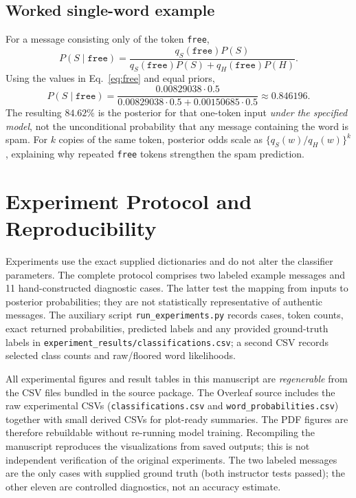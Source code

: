 \documentclass[11pt,letterpaper]{article}
\begin{document}
\subsection{Worked single-word example}
For a message consisting only of the token \texttt{free},
\begin{equation}\label{eq:singlefree}
P(S\mid \texttt{free})=
\frac{q_S(\texttt{free})P(S)}{q_S(\texttt{free})P(S)+q_H(\texttt{free})P(H)}.
\end{equation}
Using the values in Eq.~\eqref{eq:free} and equal priors,
\begin{equation}\label{eq:singlefree2}
P(S\mid \texttt{free})=
\frac{0.00829038\cdot 0.5}{0.00829038\cdot 0.5+0.00150685\cdot 0.5}
\approx 0.846196.
\end{equation}
The resulting $84.62\%$ is the posterior for that one-token input \emph{under the specified model}, not the unconditional probability that any message containing the word is spam. For $k$ copies of the same token, posterior odds scale as $\{q_S(w)/q_H(w)\}^{k}$, explaining why repeated \texttt{free} tokens strengthen the spam prediction.

\section{Experiment Protocol and Reproducibility}
Experiments use the exact supplied dictionaries and do not alter the classifier parameters. The complete protocol comprises two labeled example messages and 11 hand-constructed diagnostic cases. The latter test the mapping from inputs to posterior probabilities; they are not statistically representative of authentic messages. The auxiliary script \texttt{run\_experiments.py} records cases, token counts, exact returned probabilities, predicted labels and any provided ground-truth labels in \texttt{experiment\_results/classifications.csv}; a second CSV records selected class counts and raw/floored word likelihoods.

All experimental figures and result tables in this manuscript are \emph{regenerable} from the CSV files bundled in the source package. The Overleaf source includes the raw experimental CSVs (\texttt{classifications.csv} and \texttt{word\_probabilities.csv}) together with small derived CSVs for plot-ready summaries. The PDF figures are therefore rebuildable without re-running model training. Recompiling the manuscript reproduces the visualizations from saved outputs; this is not independent verification of the original experiments. The two labeled messages are the only cases with supplied ground truth (both instructor tests passed); the other eleven are controlled diagnostics, not an accuracy estimate.
\end{document}
